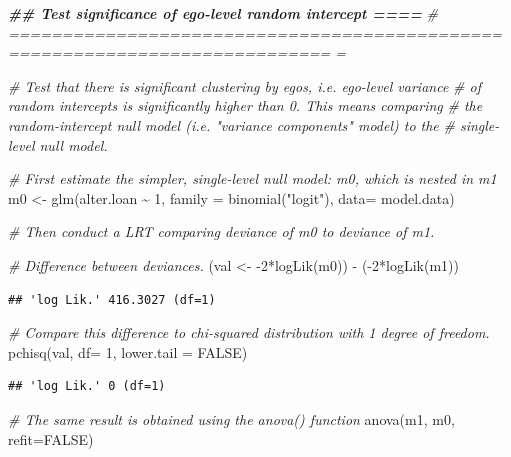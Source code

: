 \documentclass[
]{book}
\newenvironment{Shaded}{\begin{snugshade}}{\end{snugshade}}
\newcommand{\AttributeTok}[1]{\textcolor[rgb]{0.77,0.63,0.00}{#1}}
\newcommand{\CommentTok}[1]{\textcolor[rgb]{0.56,0.35,0.01}{\textit{#1}}}
\newcommand{\ConstantTok}[1]{\textcolor[rgb]{0.00,0.00,0.00}{#1}}
\newcommand{\DecValTok}[1]{\textcolor[rgb]{0.00,0.00,0.81}{#1}}
\newcommand{\DocumentationTok}[1]{\textcolor[rgb]{0.56,0.35,0.01}{\textbf{\textit{#1}}}}
\newcommand{\FunctionTok}[1]{\textcolor[rgb]{0.00,0.00,0.00}{#1}}
\newcommand{\NormalTok}[1]{#1}
\newcommand{\OtherTok}[1]{\textcolor[rgb]{0.56,0.35,0.01}{#1}}
\newcommand{\SpecialCharTok}[1]{\textcolor[rgb]{0.00,0.00,0.00}{#1}}
\newcommand{\StringTok}[1]{\textcolor[rgb]{0.31,0.60,0.02}{#1}}
\begin{document}
\begin{Shaded}
\begin{Highlighting}[]
\DocumentationTok{\#\# Test significance of ego{-}level random intercept                          ====}
\CommentTok{\# ============================================================================ =}

\CommentTok{\# Test that there is significant clustering by egos, i.e. ego{-}level variance}
\CommentTok{\# of random intercepts is significantly higher than 0. This means comparing}
\CommentTok{\# the random{-}intercept null model (i.e. "variance components" model) to the }
\CommentTok{\# single{-}level null model.}

\CommentTok{\# First estimate the simpler, single{-}level null model: m0, which is nested in m1}
\NormalTok{m0 }\OtherTok{\textless{}{-}} \FunctionTok{glm}\NormalTok{(alter.loan }\SpecialCharTok{\textasciitilde{}} \DecValTok{1}\NormalTok{, }\AttributeTok{family =} \FunctionTok{binomial}\NormalTok{(}\StringTok{"logit"}\NormalTok{), }\AttributeTok{data=}\NormalTok{ model.data)}

\CommentTok{\# Then conduct a LRT comparing deviance of m0 to deviance of m1.}

\CommentTok{\# Difference between deviances.}
\NormalTok{(val }\OtherTok{\textless{}{-}} \SpecialCharTok{{-}}\DecValTok{2}\SpecialCharTok{*}\FunctionTok{logLik}\NormalTok{(m0)) }\SpecialCharTok{{-}}\NormalTok{ (}\SpecialCharTok{{-}}\DecValTok{2}\SpecialCharTok{*}\FunctionTok{logLik}\NormalTok{(m1))}
\end{Highlighting}
\end{Shaded}

\begin{verbatim}
## 'log Lik.' 416.3027 (df=1)
\end{verbatim}

\begin{Shaded}
\begin{Highlighting}[]
\CommentTok{\# Compare this difference to chi{-}squared distribution with 1 degree of freedom.}
\FunctionTok{pchisq}\NormalTok{(val, }\AttributeTok{df=} \DecValTok{1}\NormalTok{, }\AttributeTok{lower.tail =} \ConstantTok{FALSE}\NormalTok{)}
\end{Highlighting}
\end{Shaded}

\begin{verbatim}
## 'log Lik.' 0 (df=1)
\end{verbatim}

\begin{Shaded}
\begin{Highlighting}[]
\CommentTok{\# The same result is obtained using the anova() function}
\FunctionTok{anova}\NormalTok{(m1, m0, }\AttributeTok{refit=}\ConstantTok{FALSE}\NormalTok{)}
\end{Highlighting}
\end{Shaded}
\end{document}
